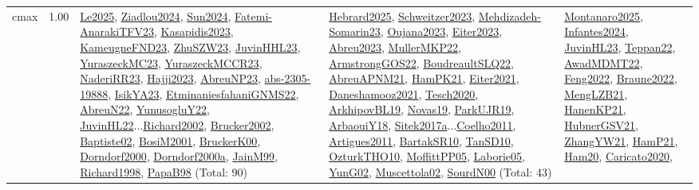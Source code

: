 {\begin{longtable}{p{3cm}r>{\raggedright\arraybackslash}p{6cm}>{\raggedright\arraybackslash}p{6cm}>{\raggedright\arraybackslash}p{8cm}}
\index{cmax}\index{Concepts!cmax}cmax &  1.00 & \hyperref[detail:Le2025]{Le2025}, \hyperref[detail:Ziadlou2024]{Ziadlou2024}, \hyperref[detail:Sun2024]{Sun2024}, \hyperref[detail:Fatemi-AnarakiTFV23]{Fatemi-AnarakiTFV23}, \hyperref[detail:Kasapidis2023]{Kasapidis2023}, \hyperref[detail:KameugneFND23]{KameugneFND23}, \hyperref[detail:ZhuSZW23]{ZhuSZW23}, \hyperref[detail:JuvinHHL23]{JuvinHHL23}, \hyperref[detail:YuraszeckMC23]{YuraszeckMC23}, \hyperref[detail:YuraszeckMCCR23]{YuraszeckMCCR23}, \hyperref[detail:NaderiRR23]{NaderiRR23}, \hyperref[detail:Hajji2023]{Hajji2023}, \hyperref[detail:AbreuNP23]{AbreuNP23}, \hyperref[detail:abs-2305-19888]{abs-2305-19888}, \hyperref[detail:IsikYA23]{IsikYA23}, \hyperref[detail:EtminaniesfahaniGNMS22]{EtminaniesfahaniGNMS22}, \hyperref[detail:AbreuN22]{AbreuN22}, \hyperref[detail:YunusogluY22]{YunusogluY22}, \hyperref[detail:JuvinHL22]{JuvinHL22}...\hyperref[detail:Richard2002]{Richard2002}, \hyperref[detail:Brucker2002]{Brucker2002}, \hyperref[detail:Baptiste02]{Baptiste02}, \hyperref[detail:BosiM2001]{BosiM2001}, \hyperref[detail:BruckerK00]{BruckerK00}, \hyperref[detail:Dorndorf2000]{Dorndorf2000}, \hyperref[detail:Dorndorf2000a]{Dorndorf2000a}, \hyperref[detail:JainM99]{JainM99}, \hyperref[detail:Richard1998]{Richard1998}, \hyperref[detail:PapaB98]{PapaB98} (Total: 90) & \hyperref[detail:Hebrard2025]{Hebrard2025}, \hyperref[detail:Schweitzer2023]{Schweitzer2023}, \hyperref[detail:Mehdizadeh-Somarin23]{Mehdizadeh-Somarin23}, \hyperref[detail:Oujana2023]{Oujana2023}, \hyperref[detail:Eiter2023]{Eiter2023}, \hyperref[detail:Abreu2023]{Abreu2023}, \hyperref[detail:MullerMKP22]{MullerMKP22}, \hyperref[detail:ArmstrongGOS22]{ArmstrongGOS22}, \hyperref[detail:BoudreaultSLQ22]{BoudreaultSLQ22}, \hyperref[detail:AbreuAPNM21]{AbreuAPNM21}, \hyperref[detail:HamPK21]{HamPK21}, \hyperref[detail:Eiter2021]{Eiter2021}, \hyperref[detail:Daneshamooz2021]{Daneshamooz2021}, \hyperref[detail:Tesch2020]{Tesch2020}, \hyperref[detail:ArkhipovBL19]{ArkhipovBL19}, \hyperref[detail:Novas19]{Novas19}, \hyperref[detail:ParkUJR19]{ParkUJR19}, \hyperref[detail:ArbaouiY18]{ArbaouiY18}, \hyperref[detail:Sitek2017a]{Sitek2017a}...\hyperref[detail:Coelho2011]{Coelho2011}, \hyperref[detail:Artigues2011]{Artigues2011}, \hyperref[detail:BartakSR10]{BartakSR10}, \hyperref[detail:TanSD10]{TanSD10}, \hyperref[detail:OzturkTHO10]{OzturkTHO10}, \hyperref[detail:MoffittPP05]{MoffittPP05}, \hyperref[detail:Laborie05]{Laborie05}, \hyperref[detail:YunG02]{YunG02}, \hyperref[detail:Muscettola02]{Muscettola02}, \hyperref[detail:SourdN00]{SourdN00} (Total: 43) & \hyperref[detail:Montanaro2025]{Montanaro2025}, \hyperref[detail:Infantes2024]{Infantes2024}, \hyperref[detail:JuvinHL23]{JuvinHL23}, \hyperref[detail:Teppan22]{Teppan22}, \hyperref[detail:AwadMDMT22]{AwadMDMT22}, \hyperref[detail:Feng2022]{Feng2022}, \hyperref[detail:Braune2022]{Braune2022}, \hyperref[detail:MengLZB21]{MengLZB21}, \hyperref[detail:HanenKP21]{HanenKP21}, \hyperref[detail:HubnerGSV21]{HubnerGSV21}, \hyperref[detail:ZhangYW21]{ZhangYW21}, \hyperref[detail:HamP21]{HamP21}, \hyperref[detail:Ham20]{Ham20}, \hyperref[detail:Caricato2020]{Caricato2020}, 
\end{longtable}}
